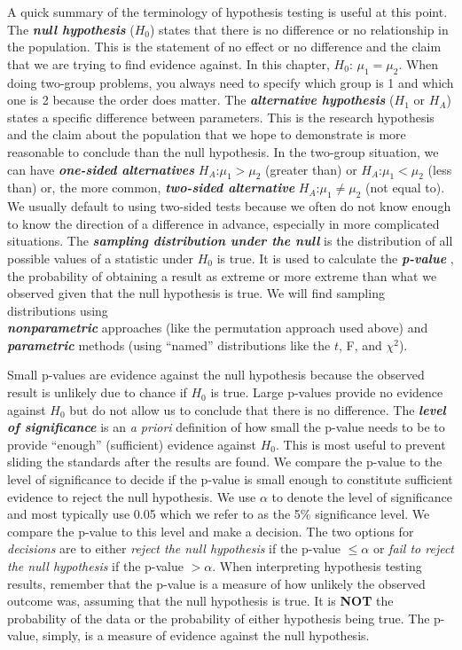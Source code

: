 \documentclass[]{book}
\begin{document}
A quick summary of the terminology of hypothesis testing is useful at
this point. The \textbf{\emph{null hypothesis}} (\(H_0\)) states that
there is no difference or no relationship in the population. This is the
statement of no effect or no difference and the claim that we are trying
to find evidence against. In this chapter, \(H_0\): \(\mu_1=\mu_2\).
When doing two-group problems, you always need to specify which group is
1 and which one is 2 because the order does matter. The
\textbf{\emph{alternative hypothesis}} (\(H_1\) or \(H_A\)) states a
specific difference between parameters. This is the research hypothesis
and the claim about the population that we hope to demonstrate is more
reasonable to conclude than the null hypothesis. In the two-group
situation, we can have \textbf{\emph{one-sided alternatives}}
\(H_A\):\(\mu_1 > \mu_2\) (greater than) or \(H_A\):\(\mu_1 < \mu_2\)
(less than) or, the more common, \textbf{\emph{two-sided alternative}}
\(H_A\):\(\mu_1 \ne \mu_2\) (not equal to). We usually default to using
two-sided tests because we often do not know enough to know the
direction of a difference in advance, especially in more complicated
situations. The \textbf{\emph{sampling distribution under the null}} is
the distribution of all possible values of a statistic under \(H_0\) is
true. It is used to calculate the \textbf{\emph{p-value}} , the
probability of obtaining a result as extreme or more extreme than what
we observed given that the null hypothesis is true. We will find
sampling distributions using\\
\textbf{\emph{nonparametric}} approaches (like the permutation approach
used above) and \textbf{\emph{parametric}} methods (using ``named''
distributions like the \(t\), F, and \(\chi^2\)).

Small p-values are evidence against the null hypothesis because the
observed result is unlikely due to chance if \(H_0\) is true. Large
p-values provide no evidence against \(H_0\) but do not allow us to
conclude that there is no difference. The \textbf{\emph{level of
significance}} is an \emph{a priori} definition of how small the p-value
needs to be to provide ``enough'' (sufficient) evidence against \(H_0\).
This is most useful to prevent sliding the standards after the results
are found. We compare the p-value to the level of significance to decide
if the p-value is small enough to constitute sufficient evidence to
reject the null hypothesis. We use \(\alpha\) to denote the level of
significance and most typically use 0.05 which we refer to as the 5\%
significance level. We compare the p-value to this level and make a
decision. The two options for \emph{decisions} are to either
\emph{reject the null hypothesis} if the p-value \(\le \alpha\) or
\emph{fail to reject the null hypothesis} if the p-value \(> \alpha\).
When interpreting hypothesis testing results, remember that the p-value
is a measure of how unlikely the observed outcome was, assuming that the
null hypothesis is true. It is \textbf{NOT} the probability of the data
or the probability of either hypothesis being true. The p-value, simply,
is a measure of evidence against the null hypothesis.
\end{document}
